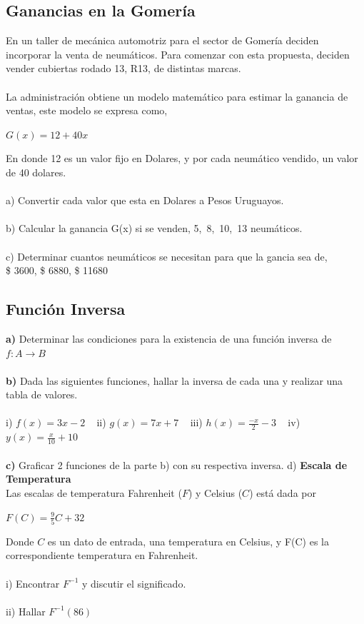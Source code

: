 \documentclass[11pt, a4paper]{article}
\begin{document}
\subsection{ Ganancias en la Gomer\'ia }
En un taller de mec\'anica automotriz para el sector de Gomer\'ia deciden incorporar la venta de neum\'aticos. 
Para comenzar con esta propuesta, deciden vender cubiertas rodado 13, R13, de distintas marcas. \\ \\
La administraci\'on obtiene un modelo matem\'atico para estimar la ganancia de ventas, este modelo se expresa como, 
\begin{center}
    {\color{blue} $ G(x) = 12 + 40x $}
\end{center}
En donde 12 es un valor fijo en Dolares, y por cada neum\'atico vendido, un valor de 40 dolares. \\ \\
a) Convertir cada valor que esta en Dolares a Pesos Uruguayos. \\ \\
b) Calcular la ganancia G(x) si se venden, 5,~8,~10,~13 neum\'aticos. \\ \\
c) Determinar cuantos neum\'aticos se necesitan para que la gancia sea de, \\ \$ 3600, \$ 6880, \$ 11680

\subsection{ Funci\'on Inversa }

\textbf{ a) } Determinar las condiciones para la existencia de una funci\'on inversa de $f: A \to B $ \\ \\
\textbf{ b)  }
Dada las siguientes funciones, hallar la inversa de cada una y realizar una tabla de valores. \\ \\ 
i) $f(x) = 3x - 2$ ~ ii) $ g(x) = 7x + 7 $ ~ iii) $\displaystyle h(x) = \frac{-x}{2} - 3 $ ~ iv) $\displaystyle y(x) = \frac{x}{10}+10$ \\ \\
\textbf{ c) } Graficar 2 funciones de la parte b) con su respectiva inversa.  \newpage 
d) \textbf{Escala de Temperatura} \\ 
Las escalas de temperatura Fahrenheit ($F$) y Celsius ($C$) est\'a dada por 
\begin{center}
    $\displaystyle F(C) = \frac{9}{5}C + 32 $
\end{center}
Donde $C$ es un dato de entrada, una temperatura en Celsius, y F(C) es la \\ correspondiente temperatura en Fahrenheit. \\ \\
i) Encontrar $F^{-1}$ y discutir el significado. \\ \\
ii) Hallar $F^{-1}(86)$
\end{document}
